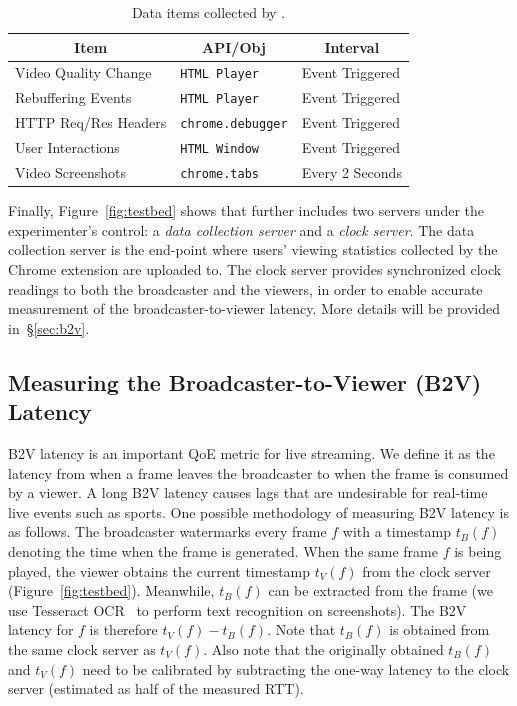 \begin{table}[]
	\centering
	\small
	\begin{tabular}{l|l|l}
		\multicolumn{1}{c|}{Item}  & \multicolumn{1}{c|}{API/Obj} & \multicolumn{1}{c}{Interval} \\
		\hline
		Video Quality Change & \texttt{HTML Player}     & Event Triggered \\
		Rebuffering Events   & \texttt{HTML Player}     & Event Triggered       \\
		HTTP Req/Res Headers & \texttt{chrome.debugger} & Event Triggered       \\
		User Interactions    & \texttt{HTML Window}     & Event Triggered       \\
		Video Screenshots    & \texttt{chrome.tabs}     & Every 2 Seconds    \\
	\end{tabular}
	\caption{Data items collected by \lime.}
	\label{tab:datacollected}
\end{table}

Finally, Figure~\ref{fig:testbed} shows that \lime further includes two servers under the experimenter's control: a \emph{data collection server} and a \emph{clock server}. The data collection server is the end-point where users' viewing statistics collected by the Chrome extension are uploaded to. The clock server provides synchronized clock readings to both the broadcaster and the viewers, in order to enable accurate measurement of the broadcaster-to-viewer latency. More details will be provided in~\S\ref{sec:b2v}.


\subsection{Measuring the Broadcaster-to-Viewer (B2V) Latency}
\label{sec:b2v_overview}
B2V latency is an important QoE metric for live streaming. We define it as the latency from when a frame leaves the broadcaster to when the frame is consumed by a viewer. A long B2V latency causes lags that are undesirable for real-time live events such as sports. One possible methodology of measuring B2V latency is as follows.
%
The broadcaster watermarks every frame $f$ with a timestamp $t_B(f)$
denoting the time when the frame is generated.
When the same frame $f$ is being played, the viewer obtains the current timestamp $t_V(f)$ from the clock server (Figure~\ref{fig:testbed}). Meanwhile, $t_B(f)$ can be extracted from the frame (we use Tesseract OCR~\cite{tesseract-ocr} to perform text recognition on screenshots).
The B2V latency for $f$ is therefore $t_V(f)-t_B(f)$.
%
Note that $t_B(f)$ is obtained from the same clock server as $t_V(f)$.
%
Also note that the originally obtained $t_B(f)$ and $t_V(f)$ need to be calibrated by subtracting the one-way latency to the clock server (estimated as half of the measured RTT).
%

